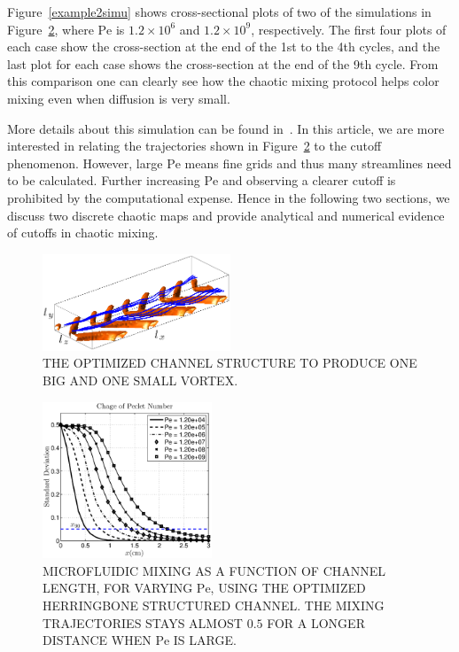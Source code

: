 \documentclass[twocolumn,10pt]{asme2e}
\begin{document}
Figure~\ref{example2simu} shows cross-sectional plots of two of the
simulations in Figure~\ref{example2trajectory}, where $\text{Pe}$ is
$1.2\times10^6$ and $1.2\times10^9$, respectively. The first four
plots of each case show the cross-section at the end of the 1st to the
4th cycles, and the last plot for each case shows the cross-section at
the end of the 9th cycle. From this comparison one can clearly see how
the chaotic mixing protocol helps color mixing even when diffusion is
very small.

More details about this simulation can be found in~\cite{topopt}. In
this article, we are more interested in relating the trajectories
shown in Figure~\ref{example2trajectory} to the cutoff
phenomenon. However, large $\text{Pe}$ means fine grids and thus many
streamlines need to be calculated. Further increasing $\text{Pe}$ and
observing a clearer cutoff is prohibited by the computational
expense. Hence in the following two sections, we discuss two discrete
chaotic maps and provide analytical and numerical evidence of cutoffs
in chaotic mixing.

  \begin{figure}
    \centerline{
     \includegraphics[width=0.5\textwidth]{example2structureherringbone}
     \vspace{-1cm}
      }
    \caption{\label{example2structureNew} THE OPTIMIZED CHANNEL
      STRUCTURE TO PRODUCE ONE BIG AND ONE SMALL VORTEX.}
  \end{figure}

  \begin{figure}
    \centerline{
     \includegraphics[width=0.45\textwidth]{example2veryPe2}}
     \caption{\label{example2trajectory} MICROFLUIDIC MIXING AS A
       FUNCTION OF CHANNEL LENGTH, FOR VARYING $\text{Pe}$, USING THE
       OPTIMIZED HERRINGBONE STRUCTURED CHANNEL. THE MIXING
       TRAJECTORIES STAYS ALMOST $0.5$ FOR A LONGER DISTANCE WHEN
       $\text{Pe}$ IS LARGE.}
  \end{figure}
\end{document}
